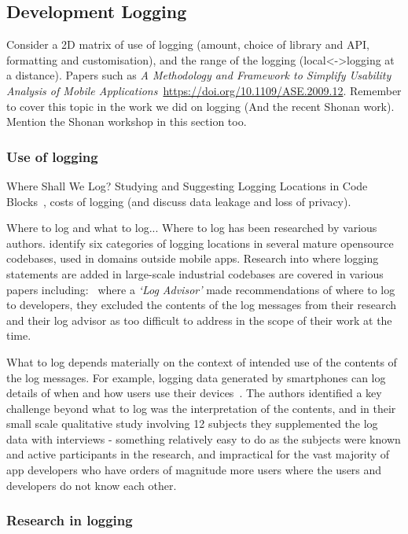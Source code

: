 \subsection{Development Logging}
Consider a 2D matrix of use of logging (amount, choice of library and API, formatting and customisation), and the range of the logging (local<->logging at a distance). Papers such as \emph{A Methodology and Framework to Simplify Usability Analysis of Mobile Applications}~\url{https://doi.org/10.1109/ASE.2009.12}. Remember to cover this topic in the work we did on logging (And the recent Shonan work). Mention the Shonan workshop in this section too.

\subsubsection{Use of logging}

Where Shall We Log? Studying and Suggesting Logging Locations in Code Blocks~\cite{li2020_where_shall_we_log}, costs of logging (and discuss data leakage and loss of privacy).


Where to log and what to log... Where to log has been researched by various authors. \cite{li2020_where_shall_we_log} identify six categories of logging locations in several mature opensource codebases, used in domains outside mobile apps. Research into where logging statements are added in large-scale industrial codebases are covered in various papers including:~\cite{zhu2015_learning_to_log} where a \emph{`Log Advisor'} made recommendations of where to log to developers, they excluded the contents of the log messages from their research and their log advisor as too difficult to address in the scope of their work at the time.

What to log depends materially on the context of intended use of the contents of the log messages. For example, logging data generated by smartphones can log details of when and how users use their devices~\citep{ormen2015_smartphone_log_data_qualitative_perspective}. The authors identified a key challenge beyond what to log was the interpretation of the contents, and in their small scale qualitative study involving 12 subjects they supplemented the log data with interviews - something relatively easy to do as the subjects were known and active participants in the research, and impractical for the vast majority of app developers who have orders of magnitude more users where the users and developers do not know each other.


\subsubsection{Research in logging}

